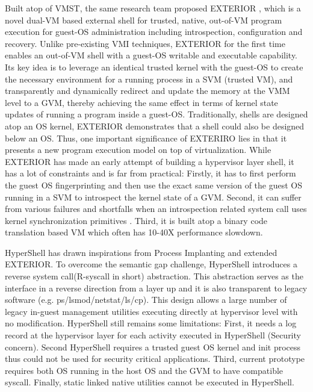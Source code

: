 Built atop of VMST, the same research team proposed EXTERIOR \cite{Reference9}, which is a novel dual-VM based external shell for trusted, 
native, out-of-VM program execution for guest-OS administration including introspection, configuration and recovery. Unlike pre-existing VMI 
techniques, EXTERIOR for the first time enables an out-of-VM shell with a guest-OS writable and executable capability. Its key idea is to 
leverage an identical trusted kernel with the guest-OS to create the necessary environment for a running process in a SVM (trusted VM), and 
transparently and dynamically redirect and update the memory at the VMM level to a GVM, thereby achieving the same effect in terms of kernel 
state updates of running a program inside a guest-OS. Traditionally, shells are designed atop an OS kernel, EXTERIOR demonstrates that a shell
could also be designed below an OS. Thus, one important significance of EXTERIRO lies in that it presents a new program execution model on top 
of virtualization. While EXTERIOR has made an early attempt of building a hypervisor layer shell, it has a lot of constraints and is far from 
practical: Firstly, it has to first perform the guest OS fingerprinting \cite{Reference30} and then use the exact same version of the guest OS 
running in a SVM to introspect the kernel state of a GVM. Second, it can suffer from various failures and shortfalls when an introspection 
related system call uses kernel synchronization primitives \cite{Reference28}. Third, it is built atop a binary code translation based VM which 
often has 10-40X performance slowdown. 

HyperShell \cite{Reference31} has drawn inspirations from Process Implanting \cite{Reference32} and extended EXTERIOR. To overcome the semantic 
gap challenge, HyperShell introduces a reverse system call(R-syscall in short) abstraction. This abstraction serves as the interface in a 
reverse direction from a layer up and it is also transparent to legacy software (e.g. ps/lsmod/netstat/ls/cp). This design allows a large number
of legacy in-guest management utilities executing directly at hypervisor level with no modification. HyperShell still remains some limitations: 
First, it needs a log record at the hypervisor layer for each activity executed in HyperShell (Security concern). Second HyperShell requires a 
trusted guest OS kernel and init process thus could not be used for security critical applications. Third, current prototype requires both OS 
running in the host OS and the GVM to have compatible syscall. Finally, static linked native utilities cannot be executed in HyperShell.


